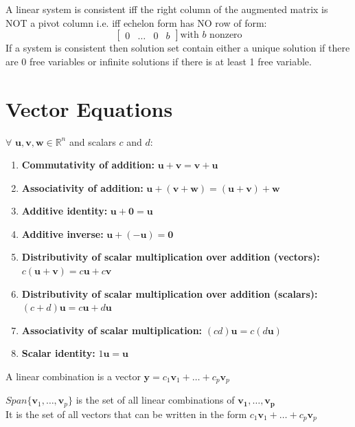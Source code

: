 \documentclass{report}
\begin{document}
A linear system is consistent iff the right column of the augmented matrix is NOT a pivot column
i.e. iff echelon form has NO row of form:
\[\begin{bmatrix}
    0 & \ldots & 0 & b
\end{bmatrix} \text{with $b$ nonzero}
\]
If a system is consistent then solution set contain either a unique solution if there are 0 free variables
or infinite solutions if there is at least 1 free variable.

\section{Vector Equations}
\begin{tcolorbox}[colback=blue!5!white, colframe=blue!75!black, title=Algebraic Properties of Vectors in $\mathbb{R}^n$]
$\forall$ $\mathbf{u}, \mathbf{v}, \mathbf{w} \in \mathbb{R}^n$ and scalars $c$ and $d$:
\begin{enumerate}
    \item \textbf{Commutativity of addition:} $\mathbf{u} + \mathbf{v} = \mathbf{v} + \mathbf{u}$
    \item \textbf{Associativity of addition:} $\mathbf{u} + (\mathbf{v} + \mathbf{w}) = (\mathbf{u} + \mathbf{v}) + \mathbf{w}$
    \item \textbf{Additive identity:} $\mathbf{u} + \mathbf{0} = \mathbf{u}$
    \item \textbf{Additive inverse:} $\mathbf{u} + (-\mathbf{u}) = \mathbf{0}$
    \item \textbf{Distributivity of scalar multiplication over addition (vectors):} $c(\mathbf{u} + \mathbf{v}) = c\mathbf{u} + c\mathbf{v}$
    \item \textbf{Distributivity of scalar multiplication over addition (scalars):} $(c + d)\mathbf{u} = c\mathbf{u} + d\mathbf{u}$
    \item \textbf{Associativity of scalar multiplication:} $(cd)\mathbf{u} = c(d\mathbf{u})$
    \item \textbf{Scalar identity:} $1 \mathbf{u} = \mathbf{u}$
\end{enumerate}
\end{tcolorbox}

A linear combination is a vector $\mathbf{y} = c_1\mathbf{v}_1 + \ldots + c_p\mathbf{v}_p$

\begin{definition}
    $Span\{\mathbf{v}_1, \ldots, \mathbf{v}_p\}$ is the set of all linear combinations of $\mathbf{v_1}, \ldots, \mathbf{v_p}$
    \\It is the set of all vectors that can be written in the form $c_1\mathbf{v}_1 + \ldots + c_p\mathbf{v}_p$
\end{definition}
\end{document}
